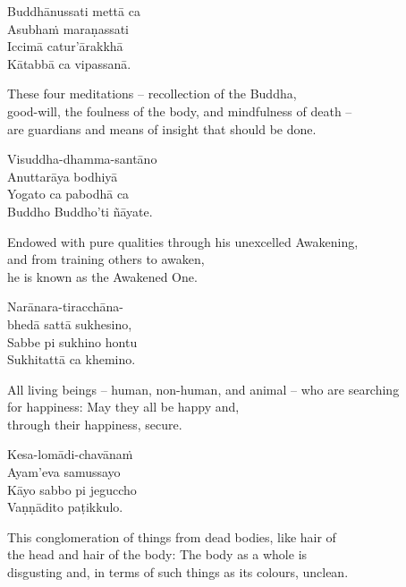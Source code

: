 Buddhānussati mettā ca\\
Asubhaṁ maraṇassati\\
Iccimā catur'ārakkhā\\
Kātabbā ca vipassanā.

\begin{english}
  These four meditations -- recollection of the Buddha,\\
  good-will, the foulness of the body, and mindfulness of death --\\
  are guardians and means of insight that should be done.
\end{english}

Visuddha-dhamma-santāno\\
Anuttarāya bodhiyā\\
Yogato ca pabodhā ca\\
Buddho Buddho'ti ñāyate.

\begin{english}
  Endowed with pure qualities through his unexcelled Awakening,\\
  and from training others to awaken,\\
  he is known as the Awakened One.
\end{english}

Narānara-tiracchāna-\\
bhedā sattā sukhesino,\\
Sabbe pi sukhino hontu\\
Sukhitattā ca khemino.

\begin{english}
  All living beings -- human, non-human, and animal -- who are searching\\
  for happiness: May they all be happy and,\\
  through their happiness, secure.
\end{english}

Kesa-lomādi-chavānaṁ\\
Ayam'eva samussayo\\
Kāyo sabbo pi jeguccho\\
Vaṇṇādito paṭikkulo.

\begin{english}
  This conglomeration of things from dead bodies, like hair of\\
  the head and hair of the body: The body as a whole is\\
  disgusting and, in terms of such things as its colours, unclean.
\end{english}

